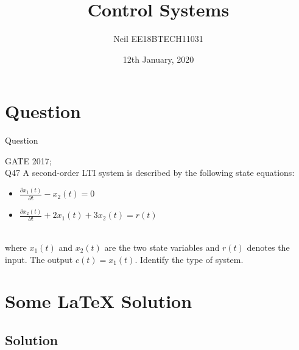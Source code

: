 \documentclass{beamer}
\title[Your Short Title]{Control Systems}
\author{Neil {EE18BTECH11031}}
\institute{IIT Hyderabad}
\date{12th January, 2020}
\begin{document}
\begin{frame}
  \titlepage
\end{frame}


\section{Question}

\begin{frame}{Question}

\begin{block}{GATE 2017; \\Q47}
A second-order LTI system is described by the following state equations: 
\begin{Large}
\begin{itemize}
    \item $\frac{\partial x_1(t)}{\partial t} - x_2(t) = 0$
    \item $\frac{\partial x_2(t)}{\partial t} + 2x_1(t) + 3x_2(t) = r(t)$
\end{itemize}
\end{Large}
\\where $x_1(t)$ and $x_2(t)$ are the two state variables and $r(t)$ denotes the input. The output $c(t) = x_1(t)$. Identify the type of system.
\end{block}

\end{frame}

\section{Some \LaTeX{} Solution}

\subsection{Solution}
\end{document}
